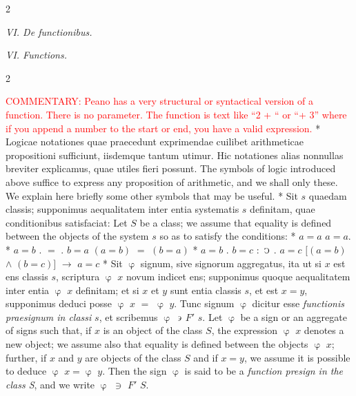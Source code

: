 \documentclass{book}
\newcommand{\C}{\mathop{\sbox0{$\displaystyle$$\reflectbox{C}$} %
\raisebox{-\height+\ht0-0.05cm}[\ht0][\dp0]{\scalebox{0.8}[0.8]{\copy0}}}\displaylimits} %
\newcommand{\such}{\thinspace \rotatebox[origin=c]{180}{$\epsilon$}}
\newcommand\commentary[1]{\textcolor{red}{COMMENTARY: #1}}
\newcommand\peanoHeadingSmall[1]{ \vspace{0.75cm} \textit{#1} \nopagebreak[4]

\vspace{0.25cm} \nopagebreak[1]}
\newenvironment{translateTwoCol}
               { %
                 \columnratio{0.5, 0.5} \begin{paracol}{2}
                 \newcommand{\LAT}{\switchcolumn[0]*}
                 \newcommand{\ENG}{\switchcolumn[1]}
               }
               { %
                 \let\ENG\undefined
                 \let\LAT\undefined
                 \end{paracol}
               }
\begin{document}
\begin{translateTwoCol}
\centering
{}
{}
\peanoHeadingSmall{VI. De functionibus.}
\ENG
\peanoHeadingSmall{VI. Functions.}
\end{translateTwoCol}

\begin{translateTwoCol}
\ENG
\commentary{Peano has a very structural or syntactical version of a function.  There is no parameter.  The function is text like ``2 + `` or ``+ 3'' where if you append a number to the start or end, you have a valid expression.}
\LAT  
Logicae notationes quae praecedunt exprimendae cuilibet arithmeticae propositioni sufficiunt, iisdemque tantum utimur. Hic notationes alias nonnullas breviter explicamus, quae utiles fieri possunt.
\ENG
The symbols of logic introduced above suffice to express any proposition of arithmetic, and we shall only these.  We explain here briefly some other symbols that may be useful.
\LAT
Sit $s$ quaedam classis; supponimus aequalitatem inter entia systematis $s$ definitam, quae conditionibus satisfaciat:
\ENG
Let $S$ be a class; we assume that equality is defined between the objects of the system $s$ so as to satisfy the conditions:
\LAT
\hspace{1.06cm} $a=a$
\ENG
\hspace{1.06cm} $a=a$.
\LAT
\hspace{1.06cm} $a=b$ $.$ $=$ $.$ $b=a$
\ENG
\hspace{1.06cm} $(a=b)$ $=$ $(b=a)$
\LAT
\hspace{1.06cm} $a=b$ . $b=c$ $:$ $\C$ $.$ $a=c$
\ENG
\hspace{1.06cm} $[(a=b)$ $\wedge$ $(b=c)]$ $\rightarrow$ $a=c$
\LAT
Sit $\upvarphi$ signum, sive signorum aggregatus, ita ut si $x$ est ens classis $s$, scriptura $\upvarphi$ $x$ novum indicet ens; supponimus quoque aequalitatem inter entia $\upvarphi$ $x$ definitam; et si $x$ et $y$ sunt entia classis $s$, et est $x=y$, supponimus deduci posse $\upvarphi$ $x$ $=$ $\upvarphi$ $y$. Tunc signum $\upvarphi$ dicitur esse \emph{functionis praesignum in classi} $s$, et scribemus $\upvarphi$ $\such$ $F'$ $s$.
\ENG
Let $\upvarphi$ be a sign or an aggregate of signs such that, if $x$ is an object of the class $S$, the expression $\upvarphi$ $x$ denotes a new object; we assume also that equality is defined between the objects $\upvarphi$ $x$; further, if $x$ and $y$ are objects of the class $S$ and if $x = y$, we assume it is possible to deduce $\upvarphi$ $x = \upvarphi$ $y$. Then the sign $\upvarphi$ is said to be a \emph{function presign in the class S}, and we write $\upvarphi$ $\ni$ $F'$ $S$.

\end{translateTwoCol}
\end{document}
